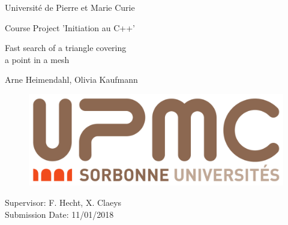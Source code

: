 \documentclass[10pt]{article}
\begin{document}
	
\begin{titlepage}
	\begin{center}
	
		{\Large
			Université de Pierre et Marie Curie \\[5mm]
		}
		\normalsize
		\medskip
		
		{\large
			Course Project 'Initiation au C++'\\[20mm]
			}
		
		
		{\Huge
			Fast search of a triangle covering\\ a point in a mesh
		}
		\vspace{2cm}
		
		\normalsize
		
		{\Large
		Arne Heimendahl, Olivia Kaufmann	
			}
		
		
		\begin{figure}[t]
			\begin{center}
			\includegraphics[width=0.5\linewidth]{UPMC_Sorbonne_Universites.png}	
			\end{center}
		\end{figure}
		
	\end{center}
	\vspace*{60mm}
	
	{\large
		Supervisor: F. Hecht, X. Claeys\\[3mm]

		Submission Date: 11/01/2018 
	}
	
	
	
\end{titlepage}

\newpage
\tableofcontents
\newpage

	
\end{document}
